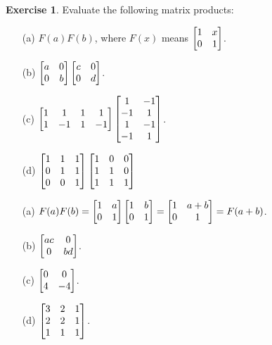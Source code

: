 \documentclass[a4paper]{book}
\theoremstyle{definition}
\newtheorem{exercise}[theorem]{Exercise}
\renewenvironment{solution}{\SolutionInline}{\endSolutionInline}
\begin{document}
\begin{exercise}
 Evaluate the following matrix products:
 \begin{itemize}
 \item[(a)] $F(a)F(b)$, where $F(x)$ means $\begin{bmatrix} 1&x\\0&1\end{bmatrix}$.
 \item[(b)] $\begin{bmatrix} a&0\\0&b\end{bmatrix} \begin{bmatrix} c&0\\0&d\end{bmatrix}$.
 \item[(c)] {\small $\begin{bmatrix} 1&1&1&1\\ 1&-1&1&-1\end{bmatrix}
                     \begin{bmatrix} 1&-1\\ -1&1\\ 1&-1\\ -1&1\end{bmatrix}$}.
 \item[(d)] {\small $\begin{bmatrix} 1&1&1\\0&1&1\\0&0&1\end{bmatrix}
                     \begin{bmatrix} 1&0&0\\1&1&0\\1&1&1\end{bmatrix}$}
 \end{itemize}
\end{exercise}
\begin{solution}
 \begin{itemize}
  \item[(a)] $F(a)F(b)=\begin{bmatrix} 1&a\\0&1\end{bmatrix} \begin{bmatrix} 1&b\\0&1\end{bmatrix}=
              \begin{bmatrix} 1&a+b\\0&1\end{bmatrix} = F(a+b)$.
  \item[(b)] $\begin{bmatrix} ac&0\\0&bd \end{bmatrix}$.
  \item[(c)] $\begin{bmatrix} 0&0\\4&-4\end{bmatrix}$.
  \item[(d)] $\begin{bmatrix} 3&2&1\\2&2&1\\1&1&1 \end{bmatrix}$.
 \end{itemize}
\end{solution}
\end{document}
